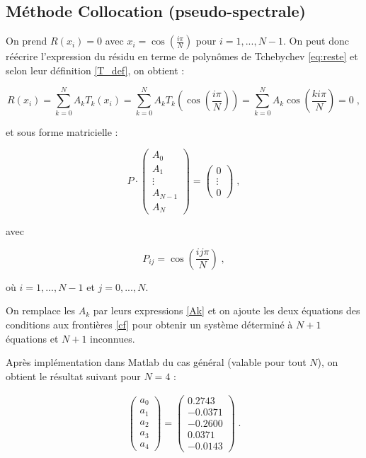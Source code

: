 \documentclass{report}
\begin{document}
\subsection{Méthode Collocation (pseudo-spectrale)}

On prend $R(x_{i})=0$ avec $x_{i}= \cos\left(\frac{i\pi}{N}\right)$ pour $i=1,...,N-1$. On peut donc réécrire l'expression du résidu en terme de polynômes de Tchebychev \eqref{eq:reste} et selon leur définition \eqref{T_def}, on obtient :

\begin{equation}
R(x_i)=\sum_{k=0}^N A_{k} T_{k}(x_i)=\sum_{k=0}^N A_{k} T_{k}\left(\cos \left(\frac{i\pi}{N}\right)\right)=\sum_{k=0}^N A_{k} \cos \left(\frac{ki\pi}{N}\right)=0\;,
\end{equation}

et sous forme matricielle :


\begin{equation}
P \cdot
\begin{pmatrix}
 A_{0}\\ 
 A_{1}\\ 
 \vdots\\ 
 A_{N-1}\\ 
 A_{N}
\end{pmatrix} 
= 
\begin{pmatrix} 
 0\\ 
 \vdots\\ 
 0
 \end{pmatrix}\;,
\end{equation}

avec

\begin{equation}
P_{ij} = \cos\left(\frac{ij\pi}{N}\right)\;,
\end{equation}

où $i = 1,...,N-1$ et $j =0,...,N$.

On remplace les $A_{k}$ par leurs expressions \eqref{Ak} et on ajoute les deux équations des conditions aux frontières \eqref{cf} pour obtenir un système déterminé à $N+1$ équations et $N+1$ inconnues.

 Après implémentation dans Matlab du cas général (valable pour tout $N$), on obtient le résultat suivant pour $N=4$ :

\begin{eqnarray}
\begin{pmatrix}
 a_0\\ 
 a_1\\ 
 a_2\\ 
 a_3\\ 
 a_4 
 \end{pmatrix}
 = \left(
\begin{array}{r}
  0.2743\\ 
 -0.0371\\ 
 -0.2600\\ 
 0.0371\\ 
 -0.0143 
 \end{array}\right)\;.
\end{eqnarray}
\end{document}
